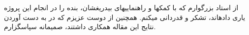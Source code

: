 


\begin{center}
\end{center}

از استاد بزرگوارم که با کمکها و راهنماییهای بیدریغشان، بنده را در انجام این پروژه یاری دادهاند، تشکر و قدردانی میکنم.
همچنین از دوست عزیزم که در به دست آوردن نتایج این مقاله همکاری داشتند، صمیمانه سپاسگزارم.

